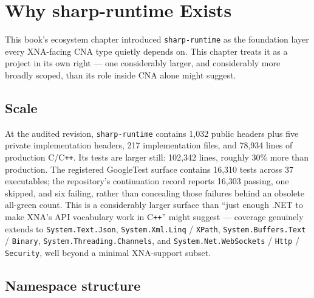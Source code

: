 \chapter{Why sharp-runtime Exists}
\label{ch:sharp-runtime-overview}

This book's ecosystem chapter introduced \texttt{sharp-runtime} as the foundation layer every
XNA-facing CNA type quietly depends on. This chapter treats it as a project in its own right
--- one considerably larger, and considerably more broadly scoped, than its role inside CNA
alone might suggest.

\section{Scale}

At the audited revision, \texttt{sharp-runtime} contains 1{,}032 public headers plus five
private implementation headers, 217 implementation files, and 78{,}934 lines of production
C/C\texttt{++}. Its tests are larger
still: 102{,}342 lines, roughly 30\% more than production. The registered GoogleTest surface
contains 16{,}310 tests across 37 executables; the repository's continuation record reports
16{,}303 passing, one skipped, and six failing, rather than concealing those failures behind
an obsolete all-green count. This is a
considerably larger surface than ``just enough .NET to make XNA's API vocabulary work in
C\texttt{++}'' might suggest --- coverage genuinely extends to \texttt{System.Text.Json},
\texttt{System.Xml.Linq} / \texttt{XPath}, \texttt{System.Buffers.Text} / \texttt{Binary},
\texttt{System.Threading.Channels}, and \texttt{System.Net.WebSockets} / \texttt{Http} /
\texttt{Security}, well beyond a minimal XNA-support subset.

\section{Namespace structure}

